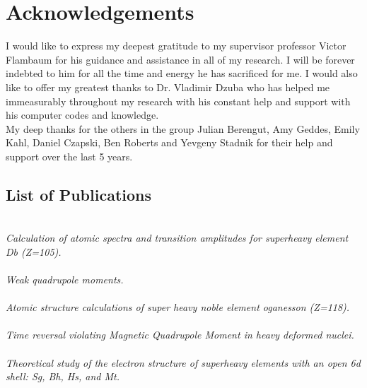 \documentclass[10pt,a4paper, twoside, openright]{report}
\begin{document}
\chapter*{Acknowledgements}
\thispagestyle{empty}
I would like to express my deepest gratitude to my supervisor professor Victor Flambaum for his guidance and assistance in all of my research. I will be forever indebted to him for all the time and energy he has sacrificed for me. I would also like to offer my greatest thanks to Dr. Vladimir Dzuba who has helped me immeasurably throughout my research with his constant help and support with his computer codes and knowledge.\\
\linebreak
My deep thanks for the others in the group Julian Berengut, Amy Geddes, Emily Kahl, Daniel Czapski, Ben Roberts and Yevgeny Stadnik for their help and support over the last 5 years. \\
\linebreak

\clearpage
\section*{List of Publications}
\cite{LDFDb2018}  \\ \textit{Calculation of atomic spectra and transition amplitudes for superheavy element Db (Z=105).} \\
\linebreak	
\cite{LFWQM2018}  \\ \textit{Weak quadrupole moments.} \\
\linebreak
\cite{LDFOg2018}  \\ \textit{Atomic structure calculations of super heavy noble element oganesson (Z=118).} \\
\linebreak
\cite{LFMQM2018}  \\ \textit{Time reversal violating Magnetic Quadrupole Moment in heavy deformed nuclei.} \\
\linebreak 
\cite{LDFSg2019}  \\ \textit{Theoretical study of the electron structure of superheavy elements with an open 6d shell: Sg, Bh, Hs, and Mt.}
\end{document}
